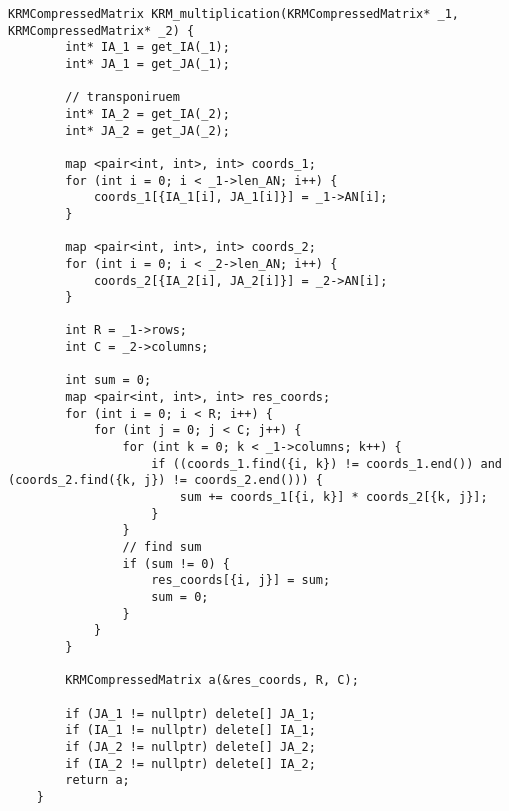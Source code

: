 \begin{lstlisting}[label=list9, caption = реализаия алгоритма умножения матриц сжатых по схеме Рейнбольдта-Местеньи]
	KRMCompressedMatrix KRM_multiplication(KRMCompressedMatrix* _1, KRMCompressedMatrix* _2) {
		int* IA_1 = get_IA(_1);
		int* JA_1 = get_JA(_1);
		
		// transponiruem
		int* IA_2 = get_IA(_2);
		int* JA_2 = get_JA(_2);
		
		map <pair<int, int>, int> coords_1;
		for (int i = 0; i < _1->len_AN; i++) {
			coords_1[{IA_1[i], JA_1[i]}] = _1->AN[i];
		}
		
		map <pair<int, int>, int> coords_2;
		for (int i = 0; i < _2->len_AN; i++) {
			coords_2[{IA_2[i], JA_2[i]}] = _2->AN[i];
		}
		
		int R = _1->rows;
		int C = _2->columns;
		
		int sum = 0;
		map <pair<int, int>, int> res_coords;
		for (int i = 0; i < R; i++) {
			for (int j = 0; j < C; j++) {
				for (int k = 0; k < _1->columns; k++) {
					if ((coords_1.find({i, k}) != coords_1.end()) and (coords_2.find({k, j}) != coords_2.end())) {
						sum += coords_1[{i, k}] * coords_2[{k, j}];
					}
				}
				// find sum
				if (sum != 0) {
					res_coords[{i, j}] = sum;
					sum = 0;
				}       
			}
		}
		
		KRMCompressedMatrix a(&res_coords, R, C);
		
		if (JA_1 != nullptr) delete[] JA_1;
		if (IA_1 != nullptr) delete[] IA_1;
		if (JA_2 != nullptr) delete[] JA_2;
		if (IA_2 != nullptr) delete[] IA_2;
		return a;
	}
\end{lstlisting}

